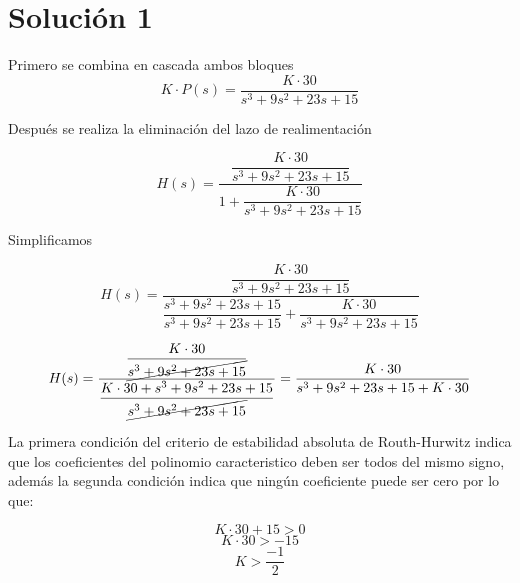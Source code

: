 
\section{Solución 1}

\newcommand{\polinomio}{s^3+9s^2+23s+15}

Primero se combina en cascada ambos bloques \\

\begin{equation*}
    K \cdot P(s) = \dfrac{K \cdot 30}{\polinomio}
\end{equation*}

Después se realiza la eliminación del lazo de realimentación

\begin{equation*}
    H(s) = \dfrac{
    \dfrac{K \cdot 30}{\polinomio}
    }{
    1 + \dfrac{K \cdot 30}{\polinomio}
    }
\end{equation*}

Simplificamos

\begin{equation*}
    H(s) = \dfrac{
    \dfrac{K \cdot 30}{\polinomio}
    }{
    \dfrac{\polinomio}{\polinomio} + \dfrac{K \cdot 30}{\polinomio}
    }
\end{equation*}

\begin{equation*}
    H(s) = \dfrac{
    \dfrac{K \cdot 30}{\cancel{\polinomio}}
    }{
    \dfrac{K \cdot 30 + {\polinomio} }{\cancel{\polinomio}}
    }
    =
    \dfrac{K \cdot 30}{{\polinomio} + K \cdot 30}
\end{equation*}

\vspace{0.1cm}

La primera condición del criterio de estabilidad absoluta de Routh-Hurwitz
indica que los coeficientes del polinomio caracteristico deben ser todos del 
mismo signo, además la segunda condición indica que ningún coeficiente puede
ser cero por lo que:

\begin{equation*}
    K \cdot 30 + 15 > 0
\end{equation*}
\begin{equation*}
    K \cdot 30 > -15
\end{equation*}
\begin{equation*}
    K  > \dfrac{-1}{2}
\end{equation*}

\newpage

